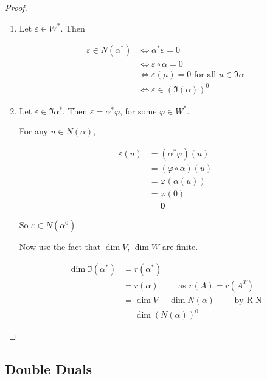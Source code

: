\documentclass[a4paper]{article}
\begin{document}
\begin{proof}
	\begin{enumerate}
		\item Let $ \varepsilon \in W^{*} $. Then 
		
		
		
		\begin{align*}
		\varepsilon \in N(\alpha^{*}) & \iff \alpha^{*} \varepsilon = 0 \\
		& \iff \varepsilon \circ \alpha = 0  \\
		& \iff \varepsilon(\mu) = 0 \text{ for all } u \in \Im \alpha\\
		&  \iff \varepsilon \in \left(  \Im(\alpha) \right)^{0}
		\end{align*}
		
		\item Let $ \varepsilon \in \Im \alpha^{*} $. Then $ \varepsilon = \alpha^{*} \varphi $, for some $ \varphi \in W^{*} $.
		
		For any $ u \in N(\alpha) $,
		
		\begin{align*}
		\varepsilon(u) & = (\alpha^{*}  \varphi )(u) \\
		& = (\varphi \circ \alpha) (u)\\
		& = \varphi(\alpha(u)) \\
		& = \varphi(0) \\
		& = \mathbf{0}
		\end{align*}
		
		So $ \varepsilon \in N(\alpha^{0}) $
		
		
		Now use the fact that $ \dim V $, $ \dim W $ are finite. 
		
		
		\begin{align*}
		\dim \Im(\alpha^{*}) & = r(\alpha^{*}) \\
		& = r(\alpha) \qquad \text{ as } r(A) = r(A^{T})  \\
		& =  \dim V - \dim N(\alpha) \qquad \text{ by R-N} \\
		& = \dim (N(\alpha))^{0}
		\end{align*}
		
	\end{enumerate}

\end{proof}


\subsection{Double Duals}
\end{document}
